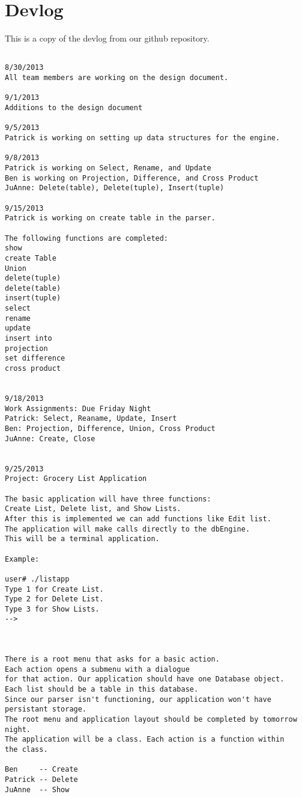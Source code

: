 \documentclass{article}
\begin{document}
\section{Devlog}
This is a copy of the devlog from our github repository.
\begin{verbatim}

8/30/2013
All team members are working on the design document.

9/1/2013
Additions to the design document

9/5/2013
Patrick is working on setting up data structures for the engine.

9/8/2013
Patrick is working on Select, Rename, and Update
Ben is working on Projection, Difference, and Cross Product
JuAnne: Delete(table), Delete(tuple), Insert(tuple)

9/15/2013
Patrick is working on create table in the parser.

The following functions are completed:
show
create Table
Union
delete(tuple)
delete(table)
insert(tuple)
select
rename
update
insert into
projection
set difference
cross product


9/18/2013
Work Assignments: Due Friday Night
Patrick: Select, Reaname, Update, Insert
Ben: Projection, Difference, Union, Cross Product
JuAnne: Create, Close 


9/25/2013
Project: Grocery List Application

The basic application will have three functions: 
Create List, Delete list, and Show Lists.
After this is implemented we can add functions like Edit list. 
The application will make calls directly to the dbEngine. 
This will be a terminal application.

Example:

user# ./listapp
Type 1 for Create List.
Type 2 for Delete List.
Type 3 for Show Lists.
-->



There is a root menu that asks for a basic action.
Each action opens a submenu with a dialogue
for that action. Our application should have one Database object. 
Each list should be a table in this database.
Since our parser isn't functioning, our application won't have persistant storage. 
The root menu and application layout should be completed by tomorrow night.
The application will be a class. Each action is a function within
the class. 

Ben     -- Create
Patrick -- Delete
JuAnne  -- Show
\end{verbatim}
\end{document}
